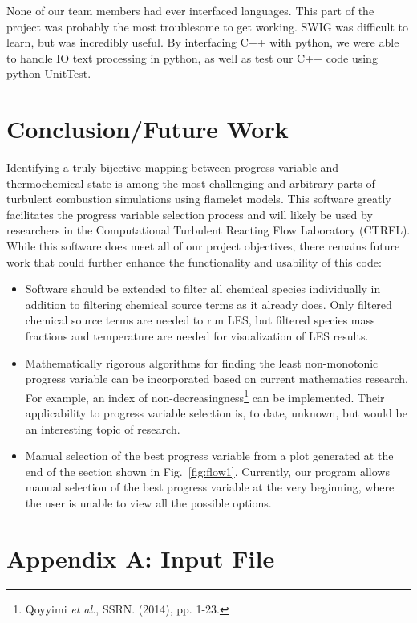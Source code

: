 \documentclass[11pt]{article}
\begin{document}
None of our team members had ever interfaced languages. This part of
the project was probably the most troublesome to get working. SWIG was
difficult to learn, but was incredibly useful. By interfacing C++ with
python, we were able to handle IO text processing in python, as well
as test our C++ code using python UnitTest.

\section{Conclusion/Future Work}
Identifying a truly bijective mapping between progress variable and
thermochemical state is among the most challenging and arbitrary parts
of turbulent combustion simulations using flamelet models. This
software greatly facilitates the progress variable selection process
and will likely be used by researchers in the Computational Turbulent
Reacting Flow Laboratory (CTRFL). While this software does meet all of
our project objectives, there remains future work that could further
enhance the functionality and usability of this code:

\begin{itemize}
\item Software should be extended to filter all chemical species
  individually in addition to filtering chemical source terms as it
  already does. Only filtered chemical source terms are needed to run
  LES, but filtered species mass fractions and temperature are needed
  for visualization of LES results.
\item Mathematically rigorous algorithms for finding the least
  non-monotonic progress variable can be incorporated based on current
  mathematics research. For example, an index of
  non-decreasingness\footnote{Qoyyimi \textit{et al.}, SSRN. (2014),
    pp. 1-23.} can be implemented. Their applicability to progress
  variable selection is, to date, unknown, but would be an interesting
  topic of research.
\item Manual selection of the best progress variable from a plot
  generated at the end of the section shown in
  Fig.~\ref{fig:flow1}. Currently, our program allows manual selection
  of the best progress variable at the very beginning, where the user
  is unable to view all the possible options.
\end{itemize}


\clearpage
\section*{Appendix A: Input File}
\end{document}
